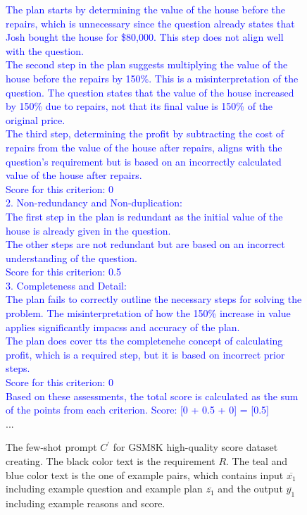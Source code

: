 \documentclass[11pt]{article}
\begin{document}
\begin{figure}
{\begin{minipage}{0.9\textwidth}
    \textcolor{blue}{The plan starts by determining the value of the house before the repairs, which is unnecessary since the question already states that Josh bought the house for \$80,000. This step does not align well with the question.} \\
    \textcolor{blue}{The second step in the plan suggests multiplying the value of the house before the repairs by 150\%. This is a misinterpretation of the question. The question states that the value of the house increased by 150\% due to repairs, not that its final value is 150\% of the original price.}\\
    \textcolor{blue}{The third step, determining the profit by subtracting the cost of repairs from the value of the house after repairs, aligns with the question's requirement but is based on an incorrectly calculated value of the house after repairs.} \\
    \textcolor{blue}{Score for this criterion: 0} \\
    \textcolor{blue}{2. Non-redundancy and Non-duplication:} \\
    \textcolor{blue}{The first step in the plan is redundant as the initial value of the house is already given in the question.} \\
    \textcolor{blue}{The other steps are not redundant but are based on an incorrect understanding of the question.} \\
    \textcolor{blue}{Score for this criterion: 0.5} \\
    \textcolor{blue}{3. Completeness and Detail:} \\
    \textcolor{blue}{The plan fails to correctly outline the necessary steps for solving the problem. The misinterpretation of how the 150\% increase in value applies significantly impacss and accuracy of the plan.} \\
    \textcolor{blue}{The plan does cover tts the completenehe concept of calculating profit, which is a required step, but it is based on incorrect prior steps.} \\
    \textcolor{blue}{Score for this criterion: 0} \\
    \textcolor{blue}{Based on these assessments, the total score is calculated as the sum of the points from each criterion. Score: [0 + 0.5 + 0] = [0.5]} \\
    \textcolor{black}{...} 
  \end{minipage}
}
\captionsetup{type=figure}
\caption{The few-shot prompt $C^{'}$ for GSM8K high-quality score dataset creating. The black color text is the requirement $R$. The teal and blue color text is the one of example pairs, which contains input $\overline{x_1}$ including example question and example plan $\overline{z_1}$ and the output $\overline{y_1}$ including example reasons and score.}
\label{fig:C_score}
\end{figure}
\end{document}
